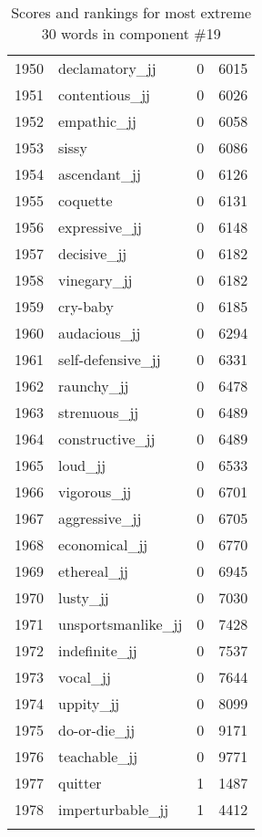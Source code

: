 \begin{longtable}[!htbp]{| rlr@{.}l |}
    1950 & declamatory\_jj & 0 & 6015 \\
    1951 & contentious\_jj & 0 & 6026 \\
    1952 & empathic\_jj & 0 & 6058 \\
    1953 & sissy & 0 & 6086 \\
    1954 & ascendant\_jj & 0 & 6126 \\
    1955 & coquette & 0 & 6131 \\
    1956 & expressive\_jj & 0 & 6148 \\
    1957 & decisive\_jj & 0 & 6182 \\
    1958 & vinegary\_jj & 0 & 6182 \\
    1959 & cry-baby & 0 & 6185 \\
    1960 & audacious\_jj & 0 & 6294 \\
    1961 & self-defensive\_jj & 0 & 6331 \\
    1962 & raunchy\_jj & 0 & 6478 \\
    1963 & strenuous\_jj & 0 & 6489 \\
    1964 & constructive\_jj & 0 & 6489 \\
    1965 & loud\_jj & 0 & 6533 \\
    1966 & vigorous\_jj & 0 & 6701 \\
    1967 & aggressive\_jj & 0 & 6705 \\
    1968 & economical\_jj & 0 & 6770 \\
    1969 & ethereal\_jj & 0 & 6945 \\
    1970 & lusty\_jj & 0 & 7030 \\
    1971 & unsportsmanlike\_jj & 0 & 7428 \\
    1972 & indefinite\_jj & 0 & 7537 \\
    1973 & vocal\_jj & 0 & 7644 \\
    1974 & uppity\_jj & 0 & 8099 \\
    1975 & do-or-die\_jj & 0 & 9171 \\
    1976 & teachable\_jj & 0 & 9771 \\
    1977 & quitter & 1 & 1487 \\
    1978 & imperturbable\_jj & 1 & 4412 \\
    \hline
    \caption{Scores and rankings for most extreme 30 words in component \#19} \\
\end{longtable}
